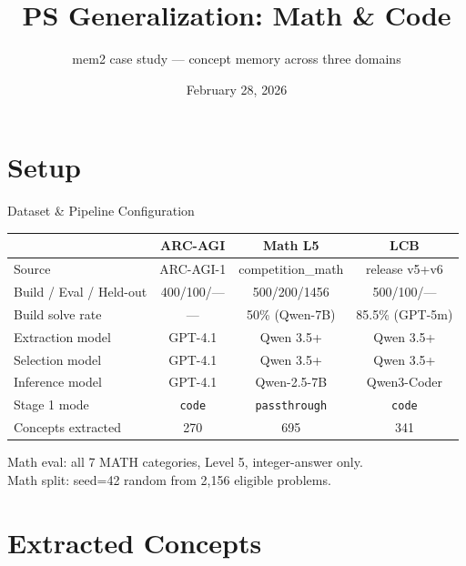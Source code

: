 \documentclass[10pt]{beamer}
\title{PS Generalization: Math \& Code}
\subtitle{mem2 case study --- concept memory across three domains}
\date{February 28, 2026}
\author{}
\institute{}
\begin{document}
\maketitle

\section{Setup}

\begin{frame}{Dataset \& Pipeline Configuration}
  \begin{table}
    \scriptsize
    \begin{tabular}{@{} l ccc @{}}
      \toprule
      & \textcolor{arcblue}{\textbf{ARC-AGI}} & \textcolor{mathgreen}{\textbf{Math L5}} & \textcolor{codeorange}{\textbf{LCB}} \\
      \midrule
      Source & ARC-AGI-1 & competition\_math & release v5+v6 \\
      Build / Eval / Held-out & 400/100/--- & 500/200/1456 & 500/100/--- \\
      Build solve rate & --- & 50\% (Qwen-7B) & 85.5\% (GPT-5m) \\
      Extraction model & GPT-4.1 & Qwen 3.5+ & Qwen 3.5+ \\
      Selection model & GPT-4.1 & Qwen 3.5+ & Qwen 3.5+ \\
      Inference model & GPT-4.1 & Qwen-2.5-7B & Qwen3-Coder \\
      \midrule
      Stage 1 mode & \texttt{code} & \texttt{passthrough} & \texttt{code} \\
      Concepts extracted & 270 & 695 & 341 \\
      \bottomrule
    \end{tabular}
  \end{table}

  \vspace{0.3em}
  Math eval: all 7 MATH categories, Level 5, integer-answer only.\\
  Math split: seed=42 random from 2{,}156 eligible problems.
\end{frame}

\section{Extracted Concepts}
\end{document}
